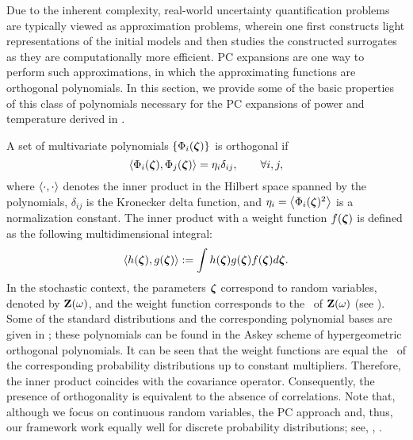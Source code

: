 Due to the inherent complexity, real-world uncertainty quantification problems are typically viewed as approximation problems, wherein one first constructs light representations of the initial models and then studies the constructed surrogates as they are computationally more efficient.
PC expansions \cite{xiu2010} are one way to perform such approximations, in which the approximating functions are orthogonal polynomials.
In this section, we provide some of the basic properties \cite{xiu2010, maitre2010} of this class of polynomials necessary for the PC expansions of power and temperature derived in .

A set of multivariate polynomials $\{ \Phi_i(\boldsymbol{\zeta}) \}$ is orthogonal if
\begin{equation} \elabel{orthogonality}
  \oInner{\pcb_i(\vz)}{\pcb_j(\vz)} = \pcn_i \delta_{ij}, \qquad \forall i, j,
\end{equation}
where $\oInner{\idot}{\idot}$ denotes the inner product in the Hilbert space spanned by the polynomials, $\delta_{ij}$ is the Kronecker delta function, and $\pcn_i = \oInner{\pcb_i(\vz)^2}$ is a normalization constant.
The inner product with a weight function $f(\boldsymbol{\zeta})$ is defined as the following multidimensional integral:
\begin{equation} \elabel{inner-product}
  \oInner{h(\vz)}{g(\vz)} := \int h(\vz) g(\vz) \fPDF(\vz) d\vz.
\end{equation}
In the stochastic context, the parameters $\boldsymbol{\zeta}$ correspond to random variables, denoted by $\mathbf{Z}(\omega)$, and the weight function corresponds to the \pdf\ of $\mathbf{Z}(\omega)$ (see ).
Some of the standard distributions and the corresponding polynomial bases are given in  \cite{eldred2008}; these polynomials can be found in the Askey scheme \cite{xiu2010} of hypergeometric orthogonal polynomials.
It can be seen that the weight functions are equal the \pdfs\ of the corresponding probability distributions up to constant multipliers.
Therefore, the inner product coincides with the covariance operator.
Consequently, the presence of orthogonality is equivalent to the absence of correlations.
Note that, although we focus on continuous random variables, the PC approach and, thus, our framework work equally well for discrete probability distributions; see, \eg, \cite{xiu2010, maitre2010}.
